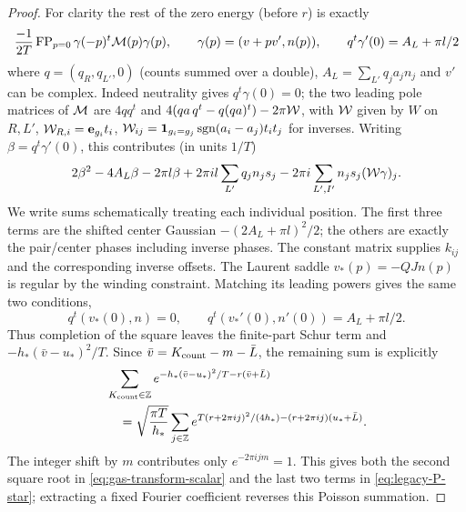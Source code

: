 \begin{proof}
For clarity the rest of the zero energy (before \(r\)) is exactly
\[
 \frac{-1}{2T}\operatorname{FP}_{p=0}\gamma(-p)^t{\cal M}(p)\gamma(p),\qquad
 \gamma(p)=(v+p v',n(p)),\qquad q^t\gamma'(0)=A_L+\pi l/2
\]
where \(q=(q_R,q_{L'},0)\) (counts summed over a double), \(A_L=\sum_{L'}q_j a_j n_j\) and \(v'\) can be complex. Indeed neutrality gives \(q^t\gamma(0)=0\); the two leading pole matrices of \({\cal M}\) are \(4qq^t\) and \(4(qa\,q^t-q(qa)^t)-2\pi{\cal W}\), with \({\cal W}\) given by \(W\) on \(R,L'\), \({\cal W}_{R,i}={\bf e}_{g_i}t_i\), \({\cal W}_{ij}={\bf1}_{g_i=g_j}\operatorname{sgn}(a_i-a_j)t_i t_j\) for inverses. Writing \(\beta=q^t\gamma'(0)\), this contributes (in units \(1/T\))
\[
 2\beta^2-4A_L\beta-2\pi l\beta
 +2\pi i l\sum_{L'}q_j n_j s_j-2\pi i\sum_{L',I'} n_j s_j({\cal W}\gamma)_j .
\]
We write sums schematically treating each individual position. The first
three terms are the shifted center Gaussian \(-(2A_L+\pi l)^2/2\);
the others are exactly the pair/center phases including inverse phases.
The constant matrix supplies \(k_{ij}\) and the corresponding inverse
offsets. The Laurent saddle \(v_*(p)=-QJn(p)\) is regular by the winding
constraint. Matching its leading powers gives the same two conditions,
\[
 q^t(v_*(0),n)=0,\qquad
 q^t(v_*'(0),n'(0))=A_L+\pi l/2.
\]
Thus completion of the square leaves the finite-part Schur term and
\(-h_*(\bar v-u_*)^2/T\). Since
\(\bar v=K_{\rm count}-m-\bar L\), the remaining sum is explicitly
\begin{equation}\label{eq:gas-zero-poisson}
\begin{split}
 &\sum_{K_{\rm count}\in\mathbb Z}
 e^{-h_*(\bar v-u_*)^2/T-r(\bar v+\bar L)}\\
 &\hspace{1em}=\sqrt{\frac{\pi T}{h_*}}
 \sum_{j\in\mathbb Z}
 e^{T(r+2\pi i j)^2/(4h_*)-(r+2\pi i j)(u_*+\bar L)}.
\end{split}
\end{equation}
The integer shift by \(m\) contributes only
\(e^{-2\pi i j m}=1\). This gives both the second square root in
\eqref{eq:gas-transform-scalar} and the last two terms in
\eqref{eq:legacy-P-star}; extracting a fixed Fourier coefficient reverses
this Poisson summation.


\end{proof}
